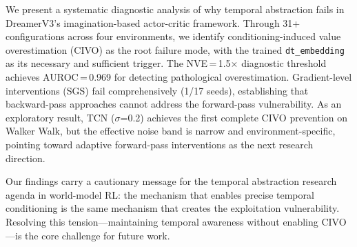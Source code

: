 \documentclass{article}
\begin{document}
We present a systematic diagnostic analysis of why temporal abstraction fails in DreamerV3's imagination-based actor-critic framework.
Through 31+ configurations across four environments, we identify conditioning-induced value overestimation (CIVO) as the root failure mode, with the trained \texttt{dt\_embedding} as its necessary and sufficient trigger.
The NVE\,=\,1.5$\times$ diagnostic threshold achieves AUROC\,=\,0.969 for detecting pathological overestimation.
Gradient-level interventions (SGS) fail comprehensively (1/17 seeds), establishing that backward-pass approaches cannot address the forward-pass vulnerability.
As an exploratory result, TCN ($\sigma$=0.2) achieves the first complete CIVO prevention on Walker Walk, but the effective noise band is narrow and environment-specific, pointing toward adaptive forward-pass interventions as the next research direction.

Our findings carry a cautionary message for the temporal abstraction research agenda in world-model RL: the mechanism that enables precise temporal conditioning is the same mechanism that creates the exploitation vulnerability.
Resolving this tension---maintaining temporal awareness without enabling CIVO---is the core challenge for future work.


\end{document}
